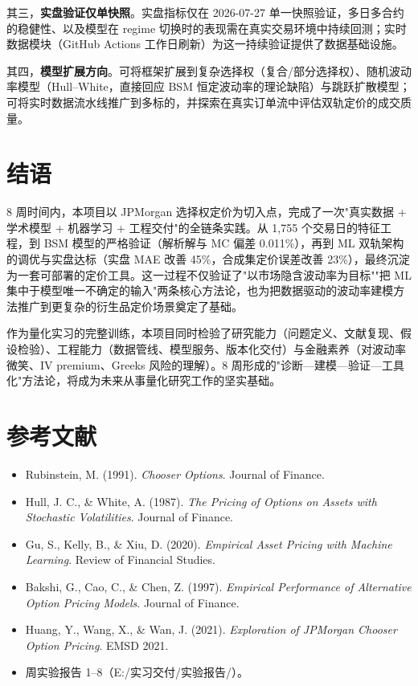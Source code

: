 \documentclass[11pt,a4paper]{article}
\begin{document}
其三，\textbf{实盘验证仅单快照}。实盘指标仅在 2026-07-27 单一快照验证，多日多合约的稳健性、以及模型在 regime 切换时的表现需在真实交易环境中持续回测；实时数据模块（GitHub Actions 工作日刷新）为这一持续验证提供了数据基础设施。

其四，\textbf{模型扩展方向}。可将框架扩展到复杂选择权（复合/部分选择权）、随机波动率模型（Hull--White，直接回应 BSM 恒定波动率的理论缺陷）与跳跃扩散模型；可将实时数据流水线推广到多标的，并探索在真实订单流中评估双轨定价的成交质量。

\section{结语}

8 周时间内，本项目以 JPMorgan 选择权定价为切入点，完成了一次"真实数据 + 学术模型 + 机器学习 + 工程交付"的全链条实践。从 1,755 个交易日的特征工程，到 BSM 模型的严格验证（解析解与 MC 偏差 0.011\%），再到 ML 双轨架构的调优与实盘达标（实盘 MAE 改善 45\%，合成集定价误差改善 23\%），最终沉淀为一套可部署的定价工具。这一过程不仅验证了"以市场隐含波动率为目标""把 ML 集中于模型唯一不确定的输入"两条核心方法论，也为把数据驱动的波动率建模方法推广到更复杂的衍生品定价场景奠定了基础。

作为量化实习的完整训练，本项目同时检验了研究能力（问题定义、文献复现、假设检验）、工程能力（数据管线、模型服务、版本化交付）与金融素养（对波动率微笑、IV premium、Greeks 风险的理解）。8 周形成的"诊断—建模—验证—工具化"方法论，将成为未来从事量化研究工作的坚实基础。

\section*{参考文献}

\begin{itemize}
\item Rubinstein, M. (1991). \emph{Chooser Options}. Journal of Finance.
\item Hull, J. C., \& White, A. (1987). \emph{The Pricing of Options on Assets with Stochastic Volatilities}. Journal of Finance.
\item Gu, S., Kelly, B., \& Xiu, D. (2020). \emph{Empirical Asset Pricing with Machine Learning}. Review of Financial Studies.
\item Bakshi, G., Cao, C., \& Chen, Z. (1997). \emph{Empirical Performance of Alternative Option Pricing Models}. Journal of Finance.
\item Huang, Y., Wang, X., \& Wan, J. (2021). \emph{Exploration of JPMorgan Chooser Option Pricing}. EMSD 2021.
\item 周实验报告 1--8（E:/实习交付/实验报告/）。
\end{itemize}
\end{document}
